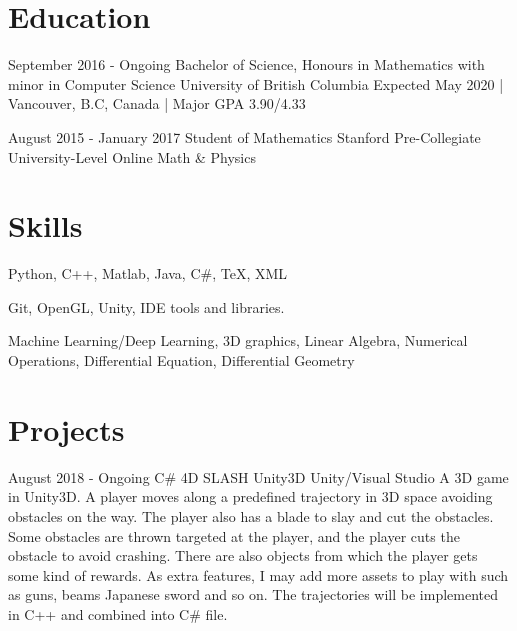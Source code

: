 \documentclass[11pt,a4paper,sans]{moderncv}
\begin{document}
\makecvtitle
\vspace*{-10mm}

\section{Education}


    \cventry    
        {September 2016 - Ongoing}
        {Bachelor of Science, Honours in Mathematics with minor in Computer Science}
        {University of British Columbia}    
        {}{}
        {\vspace{3pt} Expected May 2020 | Vancouver, B.C, Canada | Major GPA 3.90/4.33}

    \vspace{6pt}

    \cventry
        {August 2015 - January 2017} 
        {Student of Mathematics}
        {Stanford Pre-Collegiate University-Level Online Math \& Physics}   
        {}{}{}



\section{Skills}


            {Python, C++, Matlab, Java, C\#, TeX, XML }   


            {Git, OpenGL, Unity, IDE tools and libraries.}

            {Machine Learning/Deep Learning, 3D graphics, Linear Algebra, 
            Numerical Operations, Differential Equation, Differential Geometry}


\section{Projects}


    \vspace{5pt}


    \cventry
        {August 2018 - Ongoing} 
        {C\#}
        {4D SLASH}
        {Unity3D}
        {Unity/Visual Studio}
        \hline
        {  
            A 3D game in Unity3D. A player moves along a predefined trajectory in 3D space
        avoiding obstacles on the way. The player also has a blade to slay and cut 
        the obstacles. Some obstacles are thrown targeted at the player, and the player 
        cuts the obstacle to avoid crashing. There are also objects from which the player 
        gets some kind of rewards. As extra features, I may add more assets to play with 
        such as guns, beams Japanese sword and so on. 
        The trajectories will be implemented in C++ and combined into C\# file.
        }
\end{document}
